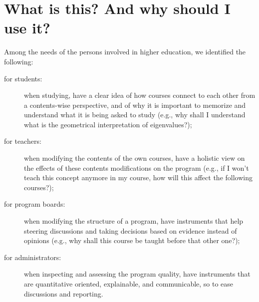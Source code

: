 \section{What is this? And why should I use it?}
\label{sec:what_is_this_and_why_should_i_use_it}

Among the needs of the persons involved in higher education, we identified the following:
%
\begin{description}
	\item[for students:] when studying, have a clear idea of how courses connect to each other from a contents-wise perspective, and of why it is important to memorize and understand what it is being asked to study (e.g., why shall I understand what is the geometrical interpretation of eigenvalues?);
	\item[for teachers:] when modifying the contents of the own courses, have a holistic view on the effects of these contents modifications on the program (e.g., if I won't teach this concept anymore in my course, how will this affect the following courses?);
	\item[for program boards:] when modifying the structure of a program, have instruments that help steering discussions and taking decisions based on evidence instead of opinions (e.g., why shall this course be taught before that other one?);
	\item[for administrators:] when inspecting and assessing the program quality, have instruments that are quantitative oriented, explainable, and communicable, so to ease discussions and reporting.
\end{description}

\begin{centering}
\end{centering}

